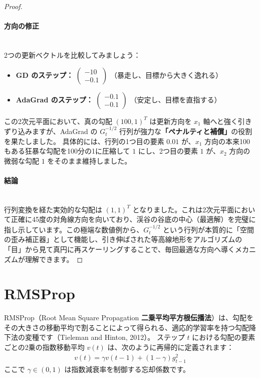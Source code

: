 \documentclass[dvipdfmx,a4paper,11pt]{jsarticle}
\begin{document}
\begin{proof}
\paragraph{方向の修正}\ \\
2つの更新ベクトルを比較してみましょう：
\begin{itemize}
    \item \textbf{GD のステップ：} $\begin{pmatrix} -10 \\ -0.1 \end{pmatrix}$ （暴走し、目標から大きく逸れる）
    \item \textbf{AdaGrad のステップ：} $\begin{pmatrix} -0.1 \\ -0.1 \end{pmatrix}$ （安定し、目標を直指する）
\end{itemize}
この2次元平面において、真の勾配 $(100, 1)^T$ は更新方向を $x_1$ 軸へと強く引きずり込みますが、AdaGrad の $G_t^{-1/2}$ 行列が強力な\textbf{「ペナルティと補償」}の役割を果たしました。
具体的には、行列の1つ目の要素 $0.01$ が、$x_1$ 方向の本来100もある狂暴な勾配を100分の1に圧縮して $1$ にし、2つ目の要素 $1$ が、$x_2$ 方向の微弱な勾配 $1$ をそのまま維持しました。

\paragraph{結論}\ \\
行列変換を経た実効的な勾配は $(1, 1)^T$ となりました。これは2次元平面において正確に45度の対角線方向を向いており、渓谷の谷底の中心（最適解）を完璧に指し示しています。この極端な数値例から、$G_t^{-1/2}$ という行列が本質的に「空間の歪み補正器」として機能し、引き伸ばされた等高線地形をアルゴリズムの「目」から見て真円に再スケーリングすることで、毎回最適な方向へ導くメカニズムが理解できます。
\end{proof}
\section{RMSProp}
RMSProp（Root Mean Square Propagation \textbf{二乗平均平方根伝播法}）は、勾配をその大きさの移動平均で割ることによって得られる、適応的学習率を持つ勾配降下法の変種です（Tieleman and Hinton, 2012）。
ステップ $t$ における勾配の要素ごとの2乗の指数移動平均 $v(t)$ は、次のように再帰的に定義されます：
\begin{align*}
    v(t) = \gamma v(t - 1) + (1 - \gamma)g_{t-1}^2
\end{align*}
ここで $\gamma \in (0, 1)$ は指数減衰率を制御する忘却係数です。
\end{document}
